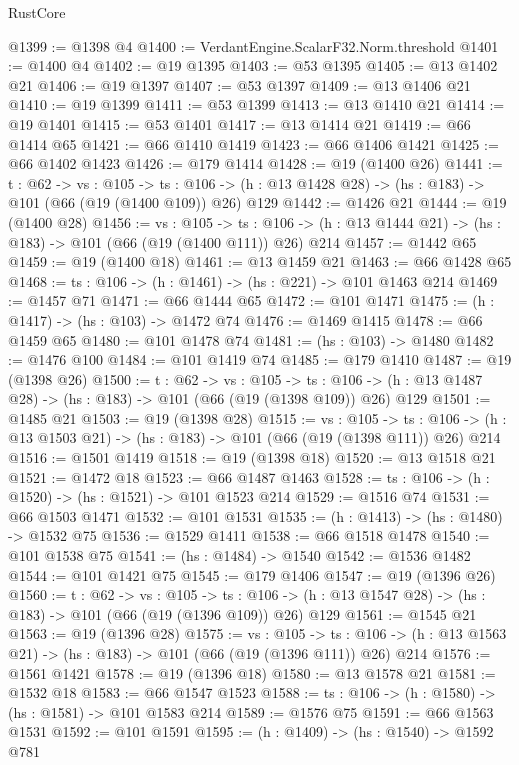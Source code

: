\begin{lexlean}{RustCore}
\begin{coremodule}
@1399 := @1398 @4
@1400 := VerdantEngine.ScalarF32.Norm.threshold
@1401 := @1400 @4
@1402 := @19 @1395
@1403 := @53 @1395
@1405 := @13 @1402 @21
@1406 := @19 @1397
@1407 := @53 @1397
@1409 := @13 @1406 @21
@1410 := @19 @1399
@1411 := @53 @1399
@1413 := @13 @1410 @21
@1414 := @19 @1401
@1415 := @53 @1401
@1417 := @13 @1414 @21
@1419 := @66 @1414 @65
@1421 := @66 @1410 @1419
@1423 := @66 @1406 @1421
@1425 := @66 @1402 @1423
@1426 := @179 @1414
@1428 := @19 (@1400 @26)
@1441 := {t : @62} ->
  {vs : @105} ->
  {ts : @106} -> (h : @13 @1428 @28) -> (hs : @183) -> @101 (@66 (@19 (@1400 @109)) @26) @129
@1442 := @1426 @21
@1444 := @19 (@1400 @28)
@1456 := {vs : @105} ->
  {ts : @106} -> (h : @13 @1444 @21) -> (hs : @183) -> @101 (@66 (@19 (@1400 @111)) @26) @214
@1457 := @1442 @65
@1459 := @19 (@1400 @18)
@1461 := @13 @1459 @21
@1463 := @66 @1428 @65
@1468 := {ts : @106} -> (h : @1461) -> (hs : @221) -> @101 @1463 @214
@1469 := @1457 @71
@1471 := @66 @1444 @65
@1472 := @101 @1471
@1475 := (h : @1417) -> (hs : @103) -> @1472 @74
@1476 := @1469 @1415
@1478 := @66 @1459 @65
@1480 := @101 @1478 @74
@1481 := (hs : @103) -> @1480
@1482 := @1476 @100
@1484 := @101 @1419 @74
@1485 := @179 @1410
@1487 := @19 (@1398 @26)
@1500 := {t : @62} ->
  {vs : @105} ->
  {ts : @106} -> (h : @13 @1487 @28) -> (hs : @183) -> @101 (@66 (@19 (@1398 @109)) @26) @129
@1501 := @1485 @21
@1503 := @19 (@1398 @28)
@1515 := {vs : @105} ->
  {ts : @106} -> (h : @13 @1503 @21) -> (hs : @183) -> @101 (@66 (@19 (@1398 @111)) @26) @214
@1516 := @1501 @1419
@1518 := @19 (@1398 @18)
@1520 := @13 @1518 @21
@1521 := @1472 @18
@1523 := @66 @1487 @1463
@1528 := {ts : @106} -> (h : @1520) -> (hs : @1521) -> @101 @1523 @214
@1529 := @1516 @74
@1531 := @66 @1503 @1471
@1532 := @101 @1531
@1535 := (h : @1413) -> (hs : @1480) -> @1532 @75
@1536 := @1529 @1411
@1538 := @66 @1518 @1478
@1540 := @101 @1538 @75
@1541 := (hs : @1484) -> @1540
@1542 := @1536 @1482
@1544 := @101 @1421 @75
@1545 := @179 @1406
@1547 := @19 (@1396 @26)
@1560 := {t : @62} ->
  {vs : @105} ->
  {ts : @106} -> (h : @13 @1547 @28) -> (hs : @183) -> @101 (@66 (@19 (@1396 @109)) @26) @129
@1561 := @1545 @21
@1563 := @19 (@1396 @28)
@1575 := {vs : @105} ->
  {ts : @106} -> (h : @13 @1563 @21) -> (hs : @183) -> @101 (@66 (@19 (@1396 @111)) @26) @214
@1576 := @1561 @1421
@1578 := @19 (@1396 @18)
@1580 := @13 @1578 @21
@1581 := @1532 @18
@1583 := @66 @1547 @1523
@1588 := {ts : @106} -> (h : @1580) -> (hs : @1581) -> @101 @1583 @214
@1589 := @1576 @75
@1591 := @66 @1563 @1531
@1592 := @101 @1591
@1595 := (h : @1409) -> (hs : @1540) -> @1592 @781

\end{coremodule}
\end{lexlean}
